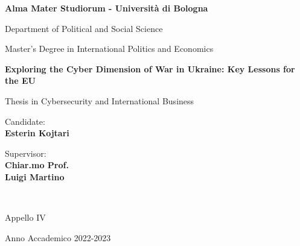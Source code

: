 \documentclass[12pt,a4paper]{report}
\newcommand{\ag}{\`a}
\begin{document}
\title{}
\author{Esterin Kojtari}
\date{8th February 2024}

\begin{titlepage}
    \begin{center}
        \vspace*{0.2cm}
        {\fontsize{19pt}{20pt}\selectfont \textbf{Alma Mater Studiorum - Universit{\ag} di Bologna}\par}
    
        \noindent\hrulefill
        \vspace{0.8cm}
        
        \Large
        
        Department of Political and Social Science
        
        Master's Degree in International Politics and Economics
        
        \Large
        \vspace{5cm}
        {\fontsize{21pt}{20}\textcolor{MyDarkBlue}{\textbf{Exploring the Cyber Dimension of War in Ukraine: Key Lessons for the EU}}}

        
        \vspace{1cm}
        {\fontsize{16pt}{16pt}Thesis in Cybersecurity and International Business}
        
        \vspace{4.5cm}
        \begin{minipage}[t]{0.34\textwidth}
        \begin{flushleft}
        {\fontsize{16pt}{16pt}Candidate: \\ \textbf{\textcolor{MyDarkBlue}{Esterin Kojtari}}}
        \end{flushleft}
        \end{minipage}
        \begin{minipage}[t]{0.64\textwidth}
        \begin{flushright} \Large
        Supervisor: \\
        \textbf{\textcolor{MyDarkBlue}{Chiar.mo Prof.}} \\ \textbf{\textcolor{MyDarkBlue}{Luigi Martino}} 
        \end{flushright}
        \end{minipage}\\
        
        \vfill
        \noindent\hrulefill
        \vspace{0.3cm}
        \Large
        
        Appello {\textcolor{MyDarkBlue} {IV}} 
        
        Anno Accademico {\textcolor{MyDarkBlue} {2022-2023}}
    \end{center}
\end{titlepage}
\restoregeometry
\vspace*{5cm}
\end{document}
